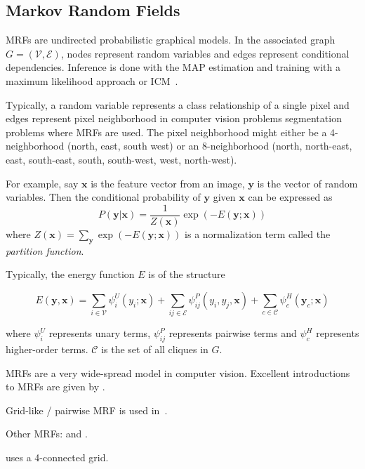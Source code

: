 
\subsection{Markov Random Fields}\label{subsec:markov-random-fields}
\Glspl{MRF} are undirected probabilistic graphical models. In the associated
graph $G=(\mathcal{V}, \mathcal{E})$, nodes represent random variables and
edges represent conditional dependencies. Inference is done with the \gls{MAP}
estimation and training with a maximum likelihood approach or
\gls{ICM}~\cite{10.2307/2345426}.

Typically, a random variable represents a class relationship of a single pixel
and edges represent pixel neighborhood in computer vision problems segmentation problems
where \glspl{MRF} are used. The pixel neighborhood might either be a
4-neighborhood (north, east, south west) or an 8-neighborhood (north,
north-east, east, south-east, south, south-west, west, north-west).

For example, say $\mathbf{x}$ is the feature vector from an image, $\mathbf{y}$
is the vector of random variables. Then the conditional probability of $\mathbf{y}$
given $\mathbf{x}$ can be expressed as
\[P(\mathbf{y}|\mathbf{x}) = \frac{1}{Z(\mathbf{x})} \exp(-E(\mathbf{y};\mathbf{x}))\]
where $Z(\mathbf{x}) = \sum_{\mathbf{y}} \exp(-E(\mathbf{y};\mathbf{x}))$ is
a normalization term called the \textit{partition function}.

Typically, the energy function $E$ is of the structure

\[E(\mathbf{y}, \mathbf{x}) = \sum_{i \in \mathcal{V}} \psi_i^U (y_i; \mathbf{x}) + \sum_{ij \in \mathcal{E}} \psi_{ij}^P(y_i, y_j, \mathbf{x}) + \sum_{c \in \mathcal{C}} \psi_c^H(\mathbf{y}_c; \mathbf{x})\]

where $\psi_i^U$ represents unary terms, $\psi_{ij}^P$ represents pairwise
terms and $\psi_c^H$ represents higher-order terms. $\mathcal{C}$ is the set
of all cliques in $G$.


\Glspl{MRF} are a very wide-spread model in computer vision. Excellent
introductions to \glspl{MRF} are given by
\cite{blake2011markov,murphy2012machine}.


Grid-like / pairwise \gls{MRF} is used in~\cite{rother2004grabcut}.

Other \glspl{MRF}: \cite{zhang2001segmentation} and \cite{moser2012markov}.

\cite{shotton2006textonboost} uses a 4-connected grid.

